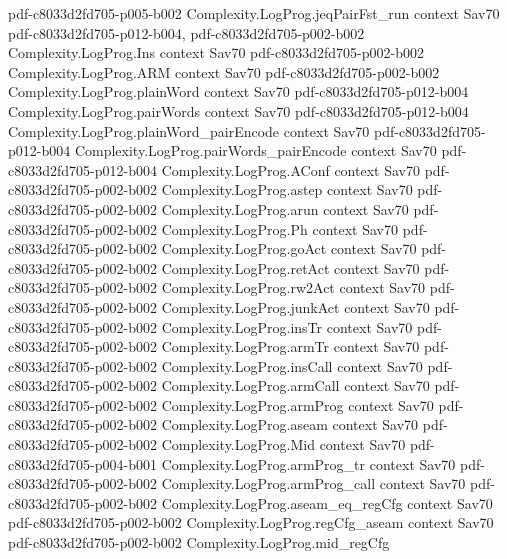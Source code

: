 \begin{theorem}
{    pdf-c8033d2fd705-p005-b002}
\proofstep
  {Complexity.LogProg.jeqPairFst_run}
  {context}
  {Sav70}
  {pdf-c8033d2fd705-p012-b004,
    pdf-c8033d2fd705-p002-b002}
\proofstep
  {Complexity.LogProg.Ins}
  {context}
  {Sav70}
  {pdf-c8033d2fd705-p002-b002}
\proofstep
  {Complexity.LogProg.ARM}
  {context}
  {Sav70}
  {pdf-c8033d2fd705-p002-b002}
\proofstep
  {Complexity.LogProg.plainWord}
  {context}
  {Sav70}
  {pdf-c8033d2fd705-p012-b004}
\proofstep
  {Complexity.LogProg.pairWords}
  {context}
  {Sav70}
  {pdf-c8033d2fd705-p012-b004}
\proofstep
  {Complexity.LogProg.plainWord_pairEncode}
  {context}
  {Sav70}
  {pdf-c8033d2fd705-p012-b004}
\proofstep
  {Complexity.LogProg.pairWords_pairEncode}
  {context}
  {Sav70}
  {pdf-c8033d2fd705-p012-b004}
\proofstep
  {Complexity.LogProg.AConf}
  {context}
  {Sav70}
  {pdf-c8033d2fd705-p002-b002}
\proofstep
  {Complexity.LogProg.astep}
  {context}
  {Sav70}
  {pdf-c8033d2fd705-p002-b002}
\proofstep
  {Complexity.LogProg.arun}
  {context}
  {Sav70}
  {pdf-c8033d2fd705-p002-b002}
\proofstep
  {Complexity.LogProg.Ph}
  {context}
  {Sav70}
  {pdf-c8033d2fd705-p002-b002}
\proofstep
  {Complexity.LogProg.goAct}
  {context}
  {Sav70}
  {pdf-c8033d2fd705-p002-b002}
\proofstep
  {Complexity.LogProg.retAct}
  {context}
  {Sav70}
  {pdf-c8033d2fd705-p002-b002}
\proofstep
  {Complexity.LogProg.rw2Act}
  {context}
  {Sav70}
  {pdf-c8033d2fd705-p002-b002}
\proofstep
  {Complexity.LogProg.junkAct}
  {context}
  {Sav70}
  {pdf-c8033d2fd705-p002-b002}
\proofstep
  {Complexity.LogProg.insTr}
  {context}
  {Sav70}
  {pdf-c8033d2fd705-p002-b002}
\proofstep
  {Complexity.LogProg.armTr}
  {context}
  {Sav70}
  {pdf-c8033d2fd705-p002-b002}
\proofstep
  {Complexity.LogProg.insCall}
  {context}
  {Sav70}
  {pdf-c8033d2fd705-p002-b002}
\proofstep
  {Complexity.LogProg.armCall}
  {context}
  {Sav70}
  {pdf-c8033d2fd705-p002-b002}
\proofstep
  {Complexity.LogProg.armProg}
  {context}
  {Sav70}
  {pdf-c8033d2fd705-p002-b002}
\proofstep
  {Complexity.LogProg.aseam}
  {context}
  {Sav70}
  {pdf-c8033d2fd705-p002-b002}
\proofstep
  {Complexity.LogProg.Mid}
  {context}
  {Sav70}
  {pdf-c8033d2fd705-p004-b001}
\proofstep
  {Complexity.LogProg.armProg_tr}
  {context}
  {Sav70}
  {pdf-c8033d2fd705-p002-b002}
\proofstep
  {Complexity.LogProg.armProg_call}
  {context}
  {Sav70}
  {pdf-c8033d2fd705-p002-b002}
\proofstep
  {Complexity.LogProg.aseam_eq_regCfg}
  {context}
  {Sav70}
  {pdf-c8033d2fd705-p002-b002}
\proofstep
  {Complexity.LogProg.regCfg_aseam}
  {context}
  {Sav70}
  {pdf-c8033d2fd705-p002-b002}
\proofstep
  {Complexity.LogProg.mid_regCfg}

\end{theorem}
